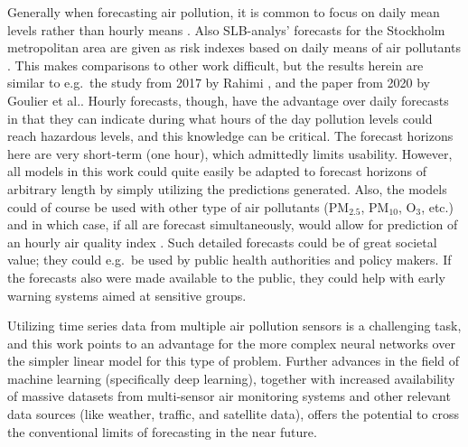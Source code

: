 Generally when forecasting air pollution, it is common to focus on daily mean levels rather than hourly means \cite{atmos7020015}. Also SLB-analys' forecasts for the Stockholm metropolitan area are given as risk indexes based on daily means of air pollutants \cite{slbanalys}. This makes comparisons to other work difficult, but the results herein are similar to e.g.\ the study from 2017 by Rahimi \cite{Rahimi2017}, and the paper from 2020 by Goulier et al.\cite{Goulier2020}. 
Hourly forecasts, though, have the advantage over daily forecasts in that they can indicate during what hours of the day pollution levels could reach hazardous levels, and this knowledge can be critical. The forecast horizons here are very short-term (one hour), which admittedly limits usability. However, all models in this work could quite easily be adapted to forecast horizons of arbitrary length by simply utilizing the predictions generated. Also, the models could of course be used with other type of air pollutants (PM$_{2.5}$, PM$_{10}$, O$_3$, etc.) and in which case, if all are forecast simultaneously, would allow for prediction of an hourly air quality index \cite{VanLoon2010}. Such detailed forecasts could be of great societal value; they could e.g.\ be used by public health authorities and policy makers. If the forecasts also were made available to the public, they could help with early warning systems aimed at sensitive groups.

Utilizing time series data from multiple air pollution sensors is a challenging task, and this work points to an advantage for the more complex neural networks over the simpler linear model for this type of problem. 
%
Further advances in the field of machine learning (specifically deep learning), together with increased availability of massive datasets from multi-sensor air monitoring systems and other relevant data sources (like weather, traffic, and satellite data), offers the potential to cross the conventional limits of forecasting in the near future. 

